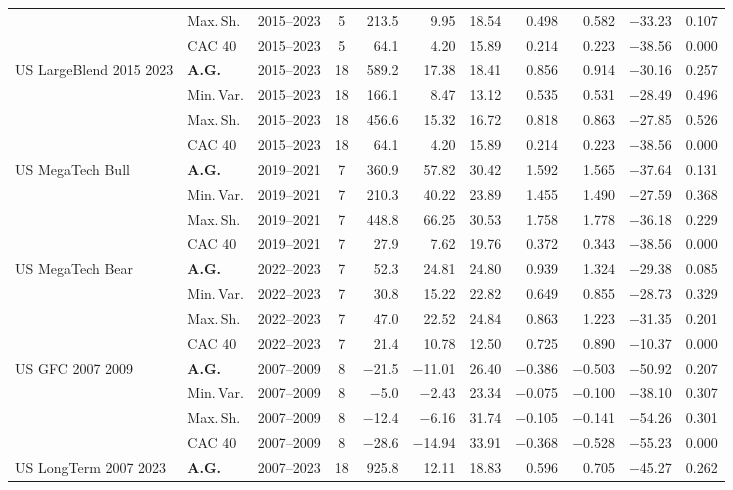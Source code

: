 \begin{longtable}{p{2.6cm} l c c r r r r r r r}
 & Max.\,Sh. & 2015--2023 & 5 & 213.5 & 9.95 & 18.54 & 0.498 & 0.582 & $-$33.23 & 0.107 \\
 & CAC 40 & 2015--2023 & 5 & 64.1 & 4.20 & 15.89 & 0.214 & 0.223 & $-$38.56 & 0.000 \\
\midrule
US LargeBlend 2015 2023 & \textbf{A.G.} & 2015--2023 & 18 & 589.2 & 17.38 & 18.41 & 0.856 & 0.914 & $-$30.16 & 0.257 \\
 & Min.\,Var. & 2015--2023 & 18 & 166.1 & 8.47 & 13.12 & 0.535 & 0.531 & $-$28.49 & 0.496 \\
 & Max.\,Sh. & 2015--2023 & 18 & 456.6 & 15.32 & 16.72 & 0.818 & 0.863 & $-$27.85 & 0.526 \\
 & CAC 40 & 2015--2023 & 18 & 64.1 & 4.20 & 15.89 & 0.214 & 0.223 & $-$38.56 & 0.000 \\
\midrule
US MegaTech Bull & \textbf{A.G.} & 2019--2021 & 7 & 360.9 & 57.82 & 30.42 & 1.592 & 1.565 & $-$37.64 & 0.131 \\
 & Min.\,Var. & 2019--2021 & 7 & 210.3 & 40.22 & 23.89 & 1.455 & 1.490 & $-$27.59 & 0.368 \\
 & Max.\,Sh. & 2019--2021 & 7 & 448.8 & 66.25 & 30.53 & 1.758 & 1.778 & $-$36.18 & 0.229 \\
 & CAC 40 & 2019--2021 & 7 & 27.9 & 7.62 & 19.76 & 0.372 & 0.343 & $-$38.56 & 0.000 \\
\midrule
US MegaTech Bear & \textbf{A.G.} & 2022--2023 & 7 & 52.3 & 24.81 & 24.80 & 0.939 & 1.324 & $-$29.38 & 0.085 \\
 & Min.\,Var. & 2022--2023 & 7 & 30.8 & 15.22 & 22.82 & 0.649 & 0.855 & $-$28.73 & 0.329 \\
 & Max.\,Sh. & 2022--2023 & 7 & 47.0 & 22.52 & 24.84 & 0.863 & 1.223 & $-$31.35 & 0.201 \\
 & CAC 40 & 2022--2023 & 7 & 21.4 & 10.78 & 12.50 & 0.725 & 0.890 & $-$10.37 & 0.000 \\
\midrule
US GFC 2007 2009 & \textbf{A.G.} & 2007--2009 & 8 & $-$21.5 & $-$11.01 & 26.40 & $-$0.386 & $-$0.503 & $-$50.92 & 0.207 \\
 & Min.\,Var. & 2007--2009 & 8 & $-$5.0 & $-$2.43 & 23.34 & $-$0.075 & $-$0.100 & $-$38.10 & 0.307 \\
 & Max.\,Sh. & 2007--2009 & 8 & $-$12.4 & $-$6.16 & 31.74 & $-$0.105 & $-$0.141 & $-$54.26 & 0.301 \\
 & CAC 40 & 2007--2009 & 8 & $-$28.6 & $-$14.94 & 33.91 & $-$0.368 & $-$0.528 & $-$55.23 & 0.000 \\
\midrule
US LongTerm 2007 2023 & \textbf{A.G.} & 2007--2023 & 18 & 925.8 & 12.11 & 18.83 & 0.596 & 0.705 & $-$45.27 & 0.262 \\

\end{longtable}
